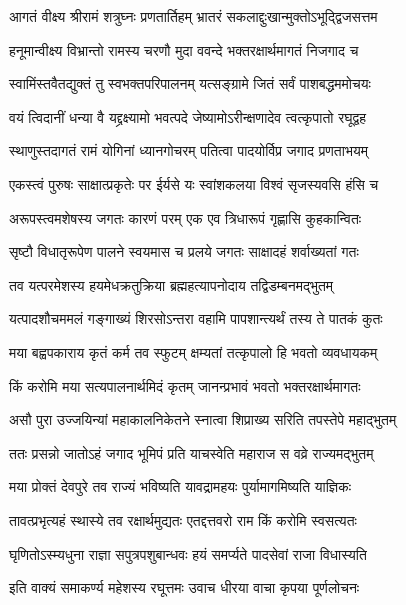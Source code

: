 \twolineshloka
{आगतं वीक्ष्य श्रीरामं शत्रुघ्नः प्रणतार्तिहम्}
{भ्रातरं सकलाद्दुःखान्मुक्तोऽभूद्द्विजसत्तम}%

\twolineshloka
{हनूमान्वीक्ष्य विभ्रान्तो रामस्य चरणौ मुदा}
{ववन्दे भक्तरक्षार्थमागतं निजगाद च}%

\twolineshloka
{स्वामिंस्तवैतद्युक्तं तु स्वभक्तपरिपालनम्}
{यत्सङ्ग्रामे जितं सर्वं पाशबद्धममोचयः}%

\twolineshloka
{वयं त्विदानीं धन्या वै यद्द्रक्ष्यामो भवत्पदे}
{जेष्यामोऽरीन्क्षणादेव त्वत्कृपातो रघूद्वह}%


\twolineshloka
{स्थाणुस्तदागतं रामं योगिनां ध्यानगोचरम्}
{पतित्वा पादयोर्विप्र जगाद प्रणताभयम्}%

\twolineshloka
{एकस्त्वं पुरुषः साक्षात्प्रकृतेः पर ईर्यसे}
{यः स्वांशकलया विश्वं सृजस्यवसि हंसि च}%

\twolineshloka
{अरूपस्त्वमशेषस्य जगतः कारणं परम्}
{एक एव त्रिधारूपं गृह्णासि कुहकान्वितः}%

\twolineshloka
{सृष्टौ विधातृरूपेण पालने स्वयमास च}
{प्रलये जगतः साक्षादहं शर्वाख्यतां गतः}%

\twolineshloka
{तव यत्परमेशस्य हयमेधक्रतुक्रिया}
{ब्रह्महत्यापनोदाय तद्विडम्बनमद्भुतम्}%

\twolineshloka
{यत्पादशौचममलं गङ्गाख्यं शिरसोऽन्तरा}
{वहामि पापशान्त्यर्थं तस्य ते पातकं कुतः}%

\twolineshloka
{मया बह्वपकाराय कृतं कर्म तव स्फुटम्}
{क्षम्यतां तत्कृपालो हि भवतो व्यवधायकम्}%

\twolineshloka
{किं करोमि मया सत्यपालनार्थमिदं कृतम्}
{जानन्प्रभावं भवतो भक्तरक्षार्थमागतः}%

\twolineshloka
{असौ पुरा उज्जयिन्यां महाकालनिकेतने}
{स्नात्वा शिप्राख्य सरिति तपस्तेपे महाद्भुतम्}%

\twolineshloka
{ततः प्रसन्नो जातोऽहं जगाद भूमिपं प्रति}
{याचस्वेति महाराज स वव्रे राज्यमद्भुतम्}%

\twolineshloka
{मया प्रोक्तं देवपुरे तव राज्यं भविष्यति}
{यावद्रामहयः पुर्यामागमिष्यति याज्ञिकः}%

\twolineshloka
{तावत्प्रभृत्यहं स्थास्ये तव रक्षार्थमुद्यतः}
{एतद्दत्तवरो राम किं करोमि स्वसत्यतः}%

\twolineshloka
{घृणितोऽस्म्यधुना राज्ञा सपुत्रपशुबान्धवः}
{हयं समर्प्यते पादसेवां राजा विधास्यति}%


\twolineshloka
{इति वाक्यं समाकर्ण्य महेशस्य रघूत्तमः}
{उवाच धीरया वाचा कृपया पूर्णलोचनः}%

